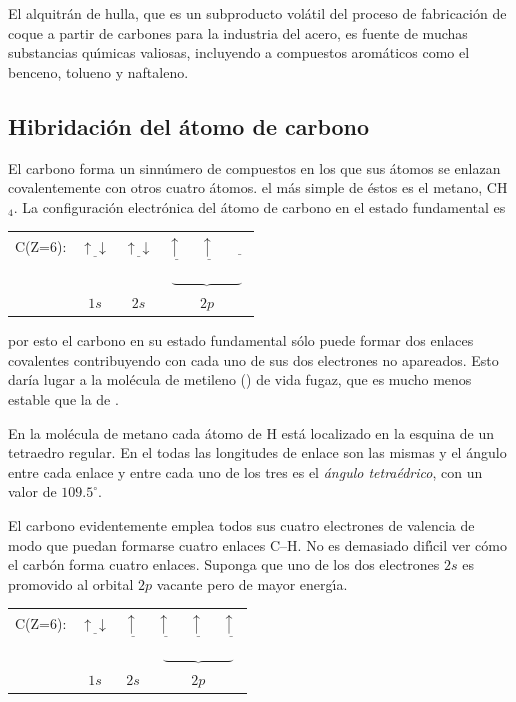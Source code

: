 El alquitr\'an de hulla, que es un subproducto vol\'atil del proceso de fabricaci\'on de
coque a partir de carbones para la industria del acero, es fuente de muchas substancias
qu\'{\i}micas valiosas, incluyendo a compuestos arom\'aticos como el benceno, tolueno y
naftaleno.

\subsection{Hibridaci\'on del \'atomo de carbono}
El carbono forma un sinn\'umero de compuestos en los que
sus \'atomos se enlazan covalentemente con otros cuatro \'atomos. el m\'as
simple de \'estos es el metano, CH$_4$. La configuraci\'on electr\'onica del
\'atomo de carbono en el estado fundamental es

\begin{center}
\begin{tabular}{rccccc}
C(Z=6):& $\underline{\uparrow \downarrow} $& $\underline{ \uparrow \downarrow}
$& $\underline{\uparrow \;} $ &$\underline{\uparrow \; }$
&$\underline{\quad}$\\[-.1in]
&&&\multicolumn{3}{c}{$\underbrace{\quad\quad\qquad\quad}$}\\
&$1s$&$2s$&\multicolumn{3}{c}{$2p$}\\
\end{tabular}
\end{center}
por esto el carbono en su estado fundamental s\'olo puede formar dos enlaces covalentes
contribuyendo con cada uno de sus dos electrones no apareados. Esto dar\'ia lugar a la
mol\'ecula de metileno () de vida fugaz, que es mucho menos estable que la de .

En la mol\'ecula de metano cada \'atomo de H est\'a localizado en la esquina de
un tetraedro regular. En el  todas las longitudes de enlace son las mismas
y el \'angulo entre cada enlace  y entre cada uno de los tres es el \textit{\'angulo
tetra\'edrico}, con un valor de $109.5^\circ$. 

El carbono evidentemente emplea todos sus cuatro electrones de valencia de modo
que puedan formarse cuatro enlaces C--H. No es demasiado dif\'{\i}cil ver c\'omo
el carb\'on forma cuatro enlaces. Suponga que uno de los dos electrones $2s$ es
promovido al orbital $2p$ vacante pero de mayor energ\'{\i}a.
\begin{center}
\begin{tabular}{rccccc}
C(Z=6):& $\underline{\uparrow \downarrow} $& $\underline{ \uparrow \;}
$& $\underline{\uparrow \;} $ &$\underline{\uparrow \; }$
&$\underline{\uparrow \;}$\\[-.1in]
&&&\multicolumn{3}{c}{$\underbrace{\quad\quad\qquad\quad}$}\\
&$1s$&$2s$&\multicolumn{3}{c}{$2p$}\\
\end{tabular}
\end{center}

